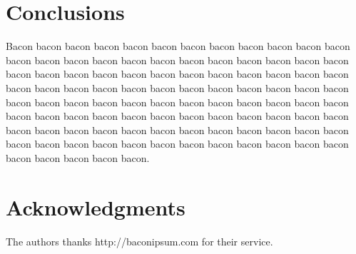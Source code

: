 \documentclass[a4paper,10pt]{article}
\begin{document}
\section{Conclusions}

Bacon bacon bacon bacon bacon bacon bacon bacon bacon bacon bacon bacon bacon bacon bacon bacon bacon bacon bacon bacon bacon bacon bacon bacon bacon bacon bacon bacon bacon bacon bacon bacon bacon bacon bacon bacon bacon bacon bacon bacon bacon bacon bacon bacon bacon bacon bacon bacon bacon bacon bacon bacon bacon bacon bacon bacon bacon bacon bacon bacon bacon bacon bacon bacon bacon bacon bacon bacon bacon bacon bacon bacon bacon bacon bacon bacon bacon bacon bacon bacon bacon bacon bacon bacon bacon bacon bacon bacon bacon bacon bacon bacon bacon bacon bacon bacon bacon bacon bacon bacon bacon. 

\section*{Acknowledgments}

The authors thanks http://baconipsum.com for their service.
\end{document}
